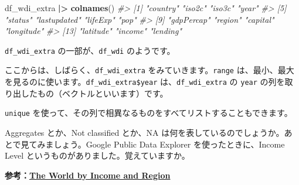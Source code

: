 \documentclass[
  xelatex, ja=standard]{bxjsbook}
\newenvironment{Shaded}{\begin{snugshade}}{\end{snugshade}}
\newcommand{\CommentTok}[1]{\textcolor[rgb]{0.56,0.35,0.01}{\textit{#1}}}
\newcommand{\FunctionTok}[1]{\textcolor[rgb]{0.13,0.29,0.53}{\textbf{#1}}}
\newcommand{\NormalTok}[1]{#1}
\newcommand{\SpecialCharTok}[1]{\textcolor[rgb]{0.81,0.36,0.00}{\textbf{#1}}}
\theoremstyle{definition}
\theoremstyle{definition}
\theoremstyle{definition}
\theoremstyle{definition}
\theoremstyle{remark}
\begin{document}
\begin{Shaded}
\begin{Highlighting}[]
\NormalTok{df\_wdi\_extra }\SpecialCharTok{|\textgreater{}} \FunctionTok{colnames}\NormalTok{()}
\CommentTok{\#\textgreater{}  [1] "country"     "iso2c"       "iso3c"       "year"       }
\CommentTok{\#\textgreater{}  [5] "status"      "lastupdated" "lifeExp"     "pop"        }
\CommentTok{\#\textgreater{}  [9] "gdpPercap"   "region"      "capital"     "longitude"  }
\CommentTok{\#\textgreater{} [13] "latitude"    "income"      "lending"}
\end{Highlighting}
\end{Shaded}

\texttt{df\_wdi\_extra} の一部が、\texttt{df\_wdi} のようです。

ここからは、しばらく、\texttt{df\_wdi\_extra} をみていきます。\texttt{range} は、最小、最大を見るのに使います。\texttt{df\_wdi\_extra\$year} は、\texttt{df\_wdi\_extra} の \texttt{year} の列を取り出したもの（ベクトルといいます）です。

\begin{Shaded}
\end{Shaded}

\texttt{unique} を使って、その列で相異なるものをすべてリストすることもできます。

\begin{Shaded}
\end{Shaded}

Aggregates とか、Not classified とか、NA は何を表しているのでしょうか。あとで見てみましょう。Google Public Data Explorer を使ったときに、Income Level というものがありました。覚えていますか。

\textbf{参考：\href{https://datatopics.worldbank.org/world-development-indicators/the-world-by-income-and-region.html}{The World by Income and Region}}
\end{document}
